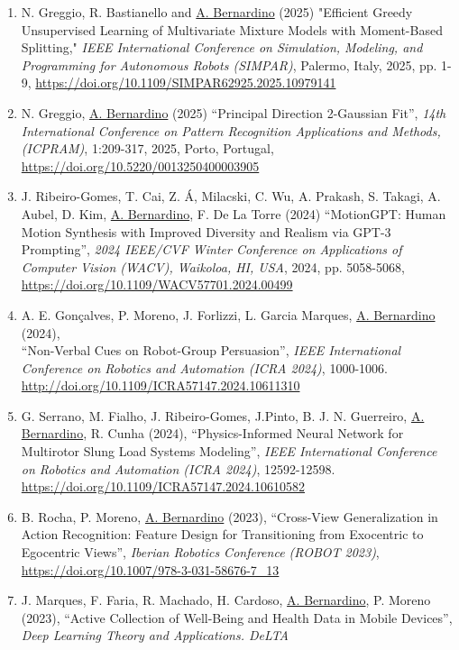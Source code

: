 \documentclass[
]{article}
\begin{document}
\begin{enumerate}
  Designing Interactive Systems Conference, pp 508~--~512.
  \url{https://doi.org/10.1145/3715668.3736344}
\item
  N. Greggio, R. Bastianello and \ul{A. Bernardino} (2025) "Efficient
  Greedy Unsupervised Learning of Multivariate Mixture Models with
  Moment-Based Splitting," \emph{IEEE International Conference on
  Simulation, Modeling, and Programming for Autonomous Robots (SIMPAR)},
  Palermo, Italy, 2025, pp. 1-9,
  \url{https://doi.org/10.1109/SIMPAR62925.2025.10979141}
\item
  N. Greggio, \ul{A. Bernardino} (2025) ``Principal Direction 2-Gaussian
  Fit'', \emph{14th International Conference on Pattern Recognition
  Applications and Methods, (ICPRAM)}, 1:209-317, 2025, Porto, Portugal,
  \url{https://doi.org/10.5220/0013250400003905}
\item
  J. Ribeiro-Gomes, T. Cai, Z. Á, Milacski, C. Wu, A. Prakash, S.
  Takagi, A. Aubel, D. Kim, \ul{A. Bernardino}, F. De La Torre (2024)
  ``MotionGPT: Human Motion Synthesis with Improved Diversity and
  Realism via GPT-3 Prompting'', \emph{2024 IEEE/CVF Winter Conference
  on Applications of Computer Vision (WACV), Waikoloa, HI, USA}, 2024,
  pp. 5058-5068, \url{https://doi.org/10.1109/WACV57701.2024.00499}
\item
  A. E. Gonçalves, P. Moreno, J. Forlizzi, L. Garcia Marques, \ul{A.
  Bernardino} (2024),\\
  ``Non-Verbal Cues on Robot-Group Persuasion'', \emph{IEEE
  International Conference on Robotics and Automation (ICRA 2024)},
  1000-1006. \url{http://doi.org/10.1109/ICRA57147.2024.10611310}
\item
  G. Serrano, M. Fialho, J. Ribeiro-Gomes, J.Pinto, B. J. N. Guerreiro,
  \ul{A. Bernardino}, R. Cunha (2024), ``Physics-Informed Neural Network
  for Multirotor Slung Load Systems Modeling'', \emph{IEEE International
  Conference on Robotics and Automation (ICRA 2024)}, 12592-12598.
  \url{https://doi.org/10.1109/ICRA57147.2024.10610582}
\item
  B. Rocha, P. Moreno, \ul{A. Bernardino} (2023), ``Cross-View
  Generalization in Action Recognition: Feature Design for Transitioning
  from Exocentric to Egocentric Views'', \emph{Iberian Robotics
  Conference (ROBOT 2023)},
  \url{https://doi.org/10.1007/978-3-031-58676-7_13}
\item
  J. Marques, F. Faria, R. Machado, H. Cardoso, \ul{A. Bernardino}, P.
  Moreno (2023), ``Active Collection of Well-Being and Health Data in
  Mobile Devices'', \emph{Deep Learning Theory and Applications. DeLTA
}
\end{enumerate}
\end{document}

